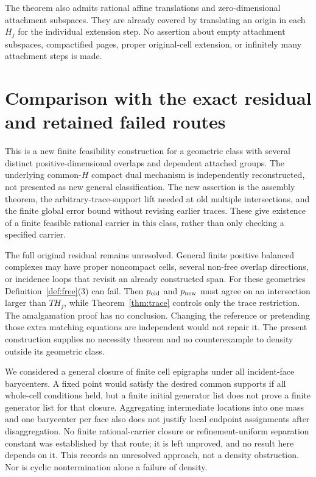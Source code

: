 \documentclass[11pt]{article}
\begin{document}
The theorem also admits rational affine translations and zero-dimensional attachment subspaces. They are already covered by translating an origin in each $H_j$ for the individual extension step. No assertion about empty attachment subspaces, compactified pages, proper original-cell extension, or infinitely many attachment steps is made.

\section{Comparison with the exact residual and retained failed routes}
This is a new finite feasibility construction for a geometric class with several distinct positive-dimensional overlaps and dependent attached groups. The underlying common-$H$ compact dual mechanism is independently reconstructed, not presented as new general classification. The new assertion is the assembly theorem, the arbitrary-trace-support lift needed at old multiple intersections, and the finite global error bound without revising earlier traces. These give existence of a finite feasible rational carrier in this class, rather than only checking a specified carrier.

The full original residual remains unresolved. General finite positive balanced complexes may have proper noncompact cells, several non-free overlap directions, or incidence loops that revisit an already constructed span. For these geometries Definition~\ref{def:free}(3) can fail. Then $p_{\rm old}$ and $p_{\rm new}$ must agree on an intersection larger than $T H_j$, while Theorem~\ref{thm:trace} controls only the trace restriction. The amalgamation proof has no conclusion. Changing the reference or pretending those extra matching equations are independent would not repair it. The present construction supplies no necessity theorem and no counterexample to density outside its geometric class.

We considered a general closure of finite cell epigraphs under all incident-face barycenters. A fixed point would satisfy the desired common supports if all whole-cell conditions held, but a finite initial generator list does not prove a finite generator list for that closure. Aggregating intermediate locations into one mass and one barycenter per face also does not justify local endpoint assignments after disaggregation. No finite rational-carrier closure or refinement-uniform separation constant was established by that route; it is left unproved, and no result here depends on it. This records an unresolved approach, not a density obstruction. Nor is cyclic nontermination alone a failure of density.
\end{document}
